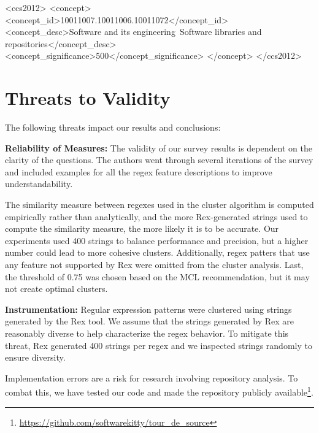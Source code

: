 \documentclass{sig-alternate-05-2015}
\newcommand{\todoMid}[1]{\textbf{\textcolor{magenta}{TODO.MID: #1}}} %
\begin{document}
\begin{CCSXML}
<ccs2012>
<concept>
<concept_id>10011007.10011006.10011072</concept_id>
<concept_desc>Software and its engineering~Software libraries and repositories</concept_desc>
<concept_significance>500</concept_significance>
</concept>
</ccs2012>
\end{CCSXML}
\printccsdesc













\section{Threats to Validity}
\label{sec:threats}
The following threats impact our results and conclusions:

\textbf{Reliability of Measures:} The validity of our survey results is dependent on the clarity of the questions. The authors went through several iterations of the survey and included examples for all the regex feature descriptions to improve understandability.

The similarity measure between regexes used in the cluster algorithm is computed empirically rather than analytically, and the more Rex-generated strings used to compute the similarity measure, the more likely it is to be accurate. Our experiments used 400 strings to balance performance and precision, but a higher number could lead to more cohesive clusters. Additionally, regex patters that use any feature not supported by Rex were omitted from the cluster analysis. Last, the threshold of 0.75 was chosen based on the MCL recommendation, but it may not create optimal clusters. %

\textbf{Instrumentation:} Regular expression patterns were clustered using strings generated by the Rex tool.  We assume that the strings generated by Rex are reasonably diverse to help characterize the regex behavior. To mitigate this threat, Rex generated 400 strings per regex and we inspected strings randomly to ensure diversity.

Implementation errors are a risk for research involving repository analysis. To combat this, we have tested our code and made the repository publicly available\footnote{\url{https://github.com/softwarekitty/tour_de_source}}.
\end{document}
